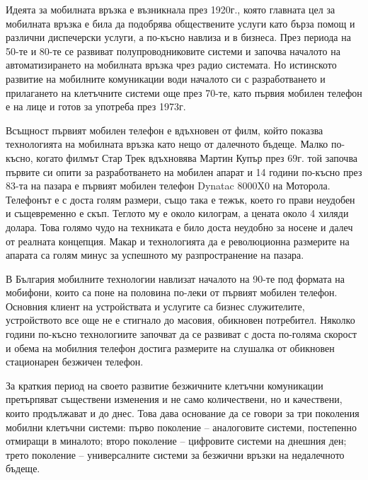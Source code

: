 Идеята за мобилната връзка е възникнала през 1920г., която главната цел за мобилната връзка е била да подобрява обществените услуги като бърза помощ и различни диспечерски услуги, а по-късно навлиза и в бизнеса. През периода на 50-те и 80-те се развиват полупроводниковите системи и започва началото на автоматизирането на мобилната връзка чрез радио системата. Но истинското развитие на мобилните комуникации води началото си с разработването и прилагането на клетъчните системи още през 70-те, като първия мобилен телефон е на лице и готов за употреба през 1973г.

Всъщност първият мобилен телефон е вдъхновен от филм, който показва технологията на мобилната връзка като нещо от далечното бъдеще. Малко по-късно, когато филмът Стар Трек вдъхновява Мартин Купър през 69г. той започва първите си опити за разработването на мобилен апарат и 14 години по-късно през 83-та на пазара е първият мобилен телефон Dynatac 8000X0 на Моторола. Телефонът е с доста голям размери, също така е тежък, което го прави неудобен и същевременно е скъп. Теглото му е около килограм, а цената около 4 хиляди долара. Това голямо чудо на техниката е било доста неудобно за носене и далеч от реалната концепция. Макар и технологията да е революционна размерите на апарата са голям минус за успешното му разпространение на пазара.

В България мобилните технологии навлизат началото на 90-те под формата на мобифони, които са поне на половина по-леки от първият мобилен телефон. Основния клиент на устройствата и услугите са бизнес служителите, устройството все още не е стигнало до масовия, обикновен потребител. Няколко години по-късно технологиите започват да се развиват с доста по-голяма скорост и обема на мобилния телефон достига размерите на слушалка от обикновен стационарен безжичен телефон.

За краткия период на своето развитие безжичните клетъчни комуникации претърпяват съществени изменения и не само количествени, но и качествени, които продължават и до днес. Това дава основание да се говори за три поколения мобилни клетъчни системи: първо поколение – аналоговите системи, постепенно отмиращи в миналото;
второ поколение – цифровите системи на днешния ден; трето поколение – универсалните системи за безжични връзки на недалечното бъдеще.

